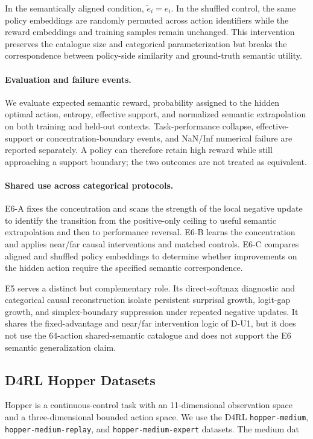 In the semantically aligned condition,
$\widetilde e_i=e_i$.
In the shuffled control, the same policy embeddings are randomly
permuted across action identifiers while the reward embeddings and
training samples remain unchanged. This intervention preserves the
catalogue size and categorical parameterization but breaks the
correspondence between policy-side similarity and ground-truth semantic
utility.

\paragraph{Evaluation and failure events.}
We evaluate expected semantic reward, probability assigned to the hidden
optimal action, entropy, effective support, and normalized semantic
extrapolation on both training and held-out contexts. Task-performance
collapse, effective-support or concentration-boundary events, and
NaN/Inf numerical failure are reported separately. A policy can
therefore retain high reward while still approaching a support boundary;
the two outcomes are not treated as equivalent.

\paragraph{Shared use across categorical protocols.}
E6-A fixes the concentration and scans the strength of the local
negative update to identify the transition from the positive-only
ceiling to useful semantic extrapolation and then to performance
reversal. E6-B learns the concentration and applies near/far causal
interventions and matched controls. E6-C compares aligned and shuffled
policy embeddings to determine whether improvements on the hidden action
require the specified semantic correspondence.

E5 serves a distinct but complementary role. Its direct-softmax
diagnostic and categorical causal reconstruction isolate persistent
surprisal growth, logit-gap growth, and simplex-boundary suppression
under repeated negative updates. It shares the fixed-advantage and
near/far intervention logic of D-U1, but it does not use the 64-action
shared-semantic catalogue and does not support the E6 semantic
generalization claim.

\subsection{D4RL Hopper Datasets}
\label{app:hopper_datasets}

Hopper is a continuous-control task with an
11-dimensional observation space and a three-dimensional bounded action
space. We use the D4RL
\texttt{hopper-medium},
\texttt{hopper-medium-replay}, and
\texttt{hopper-medium-expert}
datasets. The medium dat